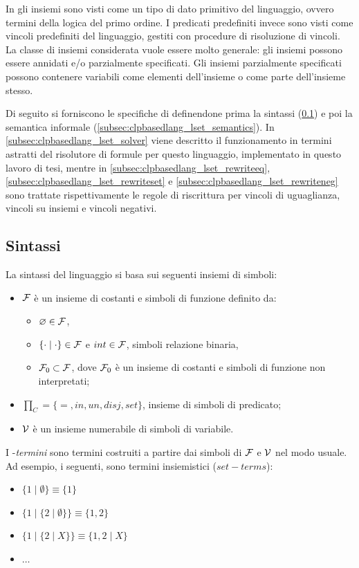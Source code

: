 \documentclass[12pt,a4paper,openright]{book} %
\begin{document}
In \lset{} gli insiemi sono visti come un tipo di dato primitivo del linguaggio, ovvero termini della logica del primo ordine. I predicati predefiniti invece sono visti come vincoli predefiniti del linguaggio, gestiti con procedure di risoluzione di vincoli. La classe di insiemi considerata vuole essere molto generale: gli insiemi possono essere annidati e/o parzialmente specificati. Gli insiemi parzialmente specificati possono contenere variabili come elementi dell’insieme o come parte dell’insieme stesso.

Di seguito si forniscono le specifiche di \lset{} definendone prima la sintassi (\ref{subsec:clpbasedlang_lset_sintax}) e poi la semantica informale (\ref{subsec:clpbasedlang_lset_semantics}). In \ref{subsec:clpbasedlang_lset_solver} viene descritto il funzionamento in termini astratti del risolutore di formule per questo linguaggio, implementato in questo lavoro di tesi, mentre in \ref{subsec:clpbasedlang_lset_rewriteeq}, \ref{subsec:clpbasedlang_lset_rewriteset} e \ref{subsec:clpbasedlang_lset_rewriteneg} sono trattate rispettivamente le regole di riscrittura per vincoli di uguaglianza, vincoli su insiemi e vincoli negativi.

\subsection{Sintassi}
\label{subsec:clpbasedlang_lset_sintax}

La sintassi del linguaggio \lset{} si basa sui seguenti insiemi di simboli:

\begin{itemize}
	\item $\mathcal{F}$ è un insieme di costanti e simboli di funzione definito da:    
	\begin{itemize}
		\item $\varnothing \in \mathcal{F}$,
		\item $\{ \cdot \mid \cdot \} \in \mathcal{F}$ e $int \in \mathcal{F}$, simboli relazione binaria,
		\item $\mathcal{F}_0 \subset \mathcal{F}$, dove $\mathcal{F}_0$ è un insieme di costanti e simboli di funzione non interpretati;
	\end{itemize}
	\item $\prod_C = \{ =, in, un, disj, set \}$, insieme di simboli di predicato;
	\item $\mathcal{V}$ è un insieme numerabile di simboli di variabile.
\end{itemize}

I \calset{}-\textit{termini} sono termini costruiti a partire dai simboli di $\mathcal{F}$ e $\mathcal{V}$ nel modo usuale. Ad esempio, i seguenti, sono termini insiemistici ($set-terms$):
\begin{itemize}
	\item $\{1 \mid \emptyset \} \equiv \{1\}$
	\item $\{1 \mid \{2 \mid \emptyset \} \} \equiv \{1,2\}$
	\item $\{1 \mid \{2 \mid X \} \} \equiv \{1,2 \mid X \}$
	\item $\ldots$
\end{itemize}
\end{document}

